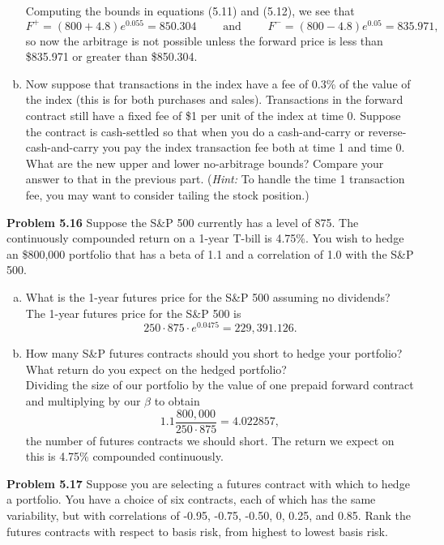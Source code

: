 \documentclass[12pt]{article}
\newcommand{\problem}[1]{\bigskip \noindent \textbf{Problem #1}}
\theoremstyle{plain}
\begin{document}
\begin{enumerate}[(a)]
Computing the bounds in equations (5.11) and (5.12), we see that
\[
F^+ = (800 + 4.8)e^{0.055} = 850.304 \quad \quad \text{ and } \quad \quad F^- = (800 - 4.8) e^{0.05} = 835.971,
\]
so now the arbitrage is not possible unless the forward price is less than \$835.971 or greater than \$850.304.

\item Now suppose that transactions in the index have a fee of 0.3\% of the value of the index (this is for both purchases and sales). Transactions in the forward contract still have a fixed fee of \$1 per unit of the index at time 0. Suppose the contract is cash-settled so that when you do a cash-and-carry or reverse-cash-and-carry you pay the index transaction fee both at time 1 and time 0. What are the new upper and lower no-arbitrage bounds? Compare your answer to that in the previous part. (\emph{Hint:} To handle the time 1 transaction fee, you may want to consider tailing the stock position.)\\
\end{enumerate}

\problem{5.16} Suppose the S\&P 500 currently has a level of 875. The continuously compounded return on a 1-year T-bill is 4.75\%. You wish to hedge an \$800,000 portfolio that has a beta of 1.1 and a correlation of 1.0 with the S\&P 500.
\begin{enumerate}[(a)]
\item What is the 1-year futures price for the S\&P 500 assuming no dividends?\\

The 1-year futures price for the S\&P 500 is
\[
250 \cdot 875 \cdot e^{0.0475} = 229,391.126.
\]

\item How many S\&P futures contracts should you short to hedge your portfolio? What return do you expect on the hedged portfolio?\\

Dividing the size of our portfolio by the value of one prepaid forward contract and multiplying by our $\beta$ to obtain
\[
1.1\frac{800,000}{250 \cdot 875} = 4.022857,
\]
the number of futures contracts we should short. The return we expect on this is 4.75\% compounded continuously.
\end{enumerate}

\problem{5.17} Suppose you are selecting a futures contract with which to hedge a portfolio. You have a choice of six contracts, each of which has the same variability, but with correlations of -0.95, -0.75, -0.50, 0, 0.25, and 0.85. Rank the futures contracts with respect to basis risk, from highest to lowest basis risk.\\
\end{document}

